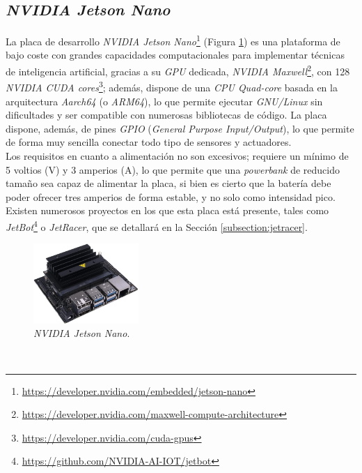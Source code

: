 \subsection{\textit{NVIDIA Jetson Nano}}
\label{subsection:jetsonnano}
La placa de desarrollo \textit{NVIDIA Jetson Nano}\footnote{\url{https://developer.nvidia.com/embedded/jetson-nano}} (Figura \ref{fig:jetsonnano}) es una plataforma de bajo coste con grandes capacidades computacionales para implementar técnicas de inteligencia artificial, gracias a su \textit{GPU} dedicada, \textit{NVIDIA Maxwell}\footnote{\url{https://developer.nvidia.com/maxwell-compute-architecture}}, con 128 \textit{NVIDIA CUDA cores}\footnote{\url{https://developer.nvidia.com/cuda-gpus}}; además, dispone de una \textit{CPU Quad-core} basada en la arquitectura \textit{Aarch64} (o \textit{ARM64}), lo que permite ejecutar \textit{GNU/Linux} sin dificultades y ser compatible con numerosas bibliotecas de código. La placa dispone, además, de pines \textit{GPIO} (\textit{General Purpose Input/Output}), lo que permite de forma muy sencilla conectar todo tipo de sensores y actuadores.\\

Los requisitos en cuanto a alimentación no son excesivos; requiere un mínimo de 5 voltios (V) y 3 amperios (A), lo que permite que una \textit{powerbank} de reducido tamaño sea capaz de alimentar la placa, si bien es cierto que la batería debe poder ofrecer tres amperios de forma estable, y no solo como intensidad pico. Existen numerosos proyectos en los que esta placa está presente, tales como \textit{JetBot}\footnote{\url{https://github.com/NVIDIA-AI-IOT/jetbot}} o \textit{JetRacer}, que se detallará en la Sección \ref{subsection:jetracer}.\\

\begin{figure} [h!]
	\begin{center}
		\includegraphics[width=4cm]{figs/jetsonnano}
	\end{center}
	\caption{\textit{NVIDIA Jetson Nano}.}
	\label{fig:jetsonnano}
\end{figure}\

